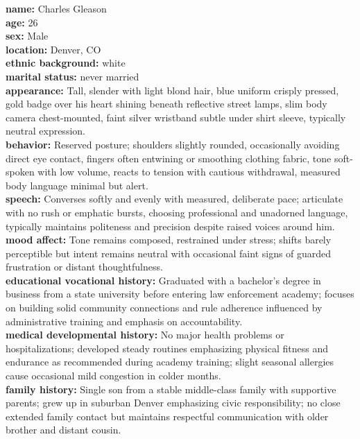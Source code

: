 \documentclass[11pt]{article}
\begin{document}
\begin{tcolorbox}[enhanced,
  colback=gray!5,
  colframe=black!75,
  fonttitle=\bfseries,
  title={Persona Inter Rater Agreement Example},
  boxrule=0.6pt,
  width=\columnwidth
]
\label{box:persona_interagreement_example}
\small

\textbf{name:} Charles Gleason \\
\textbf{age:} 26 \\
\textbf{sex:} Male \\
\textbf{location:} Denver, CO \\
\textbf{ethnic background:} white \\
\textbf{marital status:} never married \\
\textbf{appearance:} Tall, slender with light blond hair, blue uniform crisply pressed, gold badge over his heart shining beneath reflective street lamps, slim body camera chest-mounted, faint silver wristband subtle under shirt sleeve, typically neutral expression. \\
\textbf{behavior:} Reserved posture; shoulders slightly rounded, occasionally avoiding direct eye contact, fingers often entwining or smoothing clothing fabric, tone soft-spoken with low volume, reacts to tension with cautious withdrawal, measured body language minimal but alert. \\
\textbf{speech:} Converses softly and evenly with measured, deliberate pace; articulate with no rush or emphatic bursts, choosing professional and unadorned language, typically maintains politeness and precision despite raised voices around him. \\
\textbf{mood affect:} Tone remains composed, restrained under stress; shifts barely perceptible but intent remains neutral with occasional faint signs of guarded frustration or distant thoughtfulness. \\
\textbf{educational vocational history:} Graduated with a bachelor's degree in business from a state university before entering law enforcement academy; focuses on building solid community connections and rule adherence influenced by administrative training and emphasis on accountability. \\
\textbf{medical developmental history:} No major health problems or hospitalizations; developed steady routines emphasizing physical fitness and endurance as recommended during academy training; slight seasonal allergies cause occasional mild congestion in colder months. \\
\textbf{family history:} Single son from a stable middle-class family with supportive parents; grew up in suburban Denver emphasizing civic responsibility; no close extended family contact but maintains respectful communication with older brother and distant cousin. \\

\end{tcolorbox}
\end{document}
